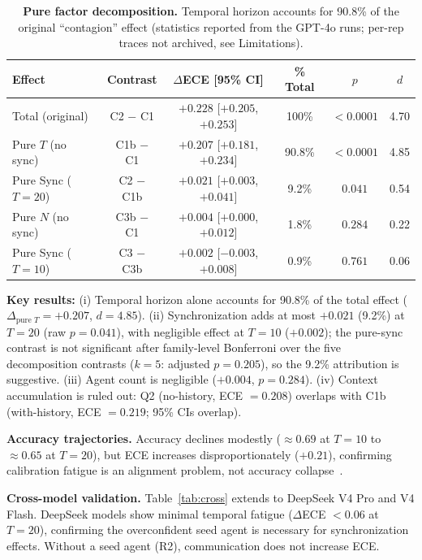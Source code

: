 \documentclass[11pt]{article}
\theoremstyle{definition}
\theoremstyle{remark}
\begin{document}
\begin{table}[H]
\centering
\caption{\textbf{Pure factor decomposition.} Temporal horizon accounts for 90.8\% of the original ``contagion'' effect (statistics reported from the GPT-4o runs; per-rep traces not archived, see Limitations).}
\label{tab:decomp}
\begin{tabular}{@{}lccccc@{}}
\toprule
Effect & Contrast & $\Delta$ECE [95\% CI] & \% Total & $p$ & $d$ \\
\midrule
Total (original) & C2 $-$ C1 & $+0.228$ [$+0.205$, $+0.253$] & 100\% & $<0.0001$ & 4.70 \\
Pure $T$ (no sync) & C1b $-$ C1 & $+0.207$ [$+0.181$, $+0.234$] & 90.8\% & $<0.0001$ & 4.85 \\
Pure Sync ($T{=}20$) & C2 $-$ C1b & $+0.021$ [$+0.003$, $+0.041$] & 9.2\% & $0.041$ & 0.54 \\
Pure $N$ (no sync) & C3b $-$ C1 & $+0.004$ [$+0.000$, $+0.012$] & 1.8\% & $0.284$ & 0.22 \\
Pure Sync ($T{=}10$) & C3 $-$ C3b & $+0.002$ [$-0.003$, $+0.008$] & 0.9\% & $0.761$ & 0.06 \\
\bottomrule
\end{tabular}
\end{table}

\textbf{Key results:} (i) Temporal horizon alone accounts for 90.8\% of the total effect ($\Delta_{\text{pure } T} = +0.207$, $d = 4.85$). (ii) Synchronization adds at most $+0.021$ (9.2\%) at $T{=}20$ (raw $p = 0.041$), with negligible effect at $T{=}10$ ($+0.002$); the pure-sync contrast is not significant after family-level Bonferroni over the five decomposition contrasts ($k{=}5$: adjusted $p = 0.205$), so the 9.2\% attribution is suggestive. (iii) Agent count is negligible ($+0.004$, $p = 0.284$). (iv) Context accumulation is ruled out: Q2 (no-history, ECE $= 0.208$) overlaps with C1b (with-history, ECE $= 0.219$; 95\% CIs overlap).

\textbf{Accuracy trajectories.} Accuracy declines modestly ($\approx 0.69$ at $T{=}10$ to $\approx 0.65$ at $T{=}20$), but ECE increases disproportionately ($+0.21$), confirming calibration fatigue is an alignment problem, not accuracy collapse~\citep{dodge2019show}.

\textbf{Cross-model validation.} Table~\ref{tab:cross} extends to DeepSeek V4 Pro and V4 Flash. DeepSeek models show minimal temporal fatigue ($\Delta$ECE $< 0.06$ at $T{=}20$), confirming the overconfident seed agent is necessary for synchronization effects. Without a seed agent (R2), communication does not increase ECE.
\end{document}
